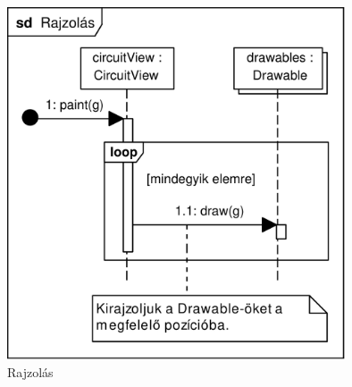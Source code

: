 \begin{figure}[h]
\begin{center}
\includegraphics[width=10cm]{chapters/chapter11/pdfs/6_paint2.pdf}
\caption{Rajzolás}
\label{fig:paint2}
\end{center}
\end{figure}